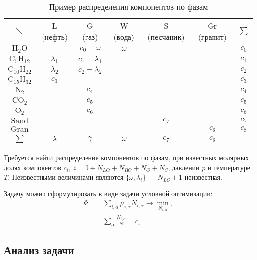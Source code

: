 \documentclass[12pt]{article}
\let\dividesymbol\div
\renewcommand{\div}{\operatorname{div}}
\begin{document}
\begin{table}[ht!]
\centering
\begin{tabular}{c|c|c|c|c|c|c}
\multicolumn{1}{c}{$\diagdown$}&
\multicolumn{1}{c}{L (нефть)}&
\multicolumn{1}{c}{G (газ)}&
\multicolumn{1}{c}{W (вода)}&
\multicolumn{1}{c}{S (песчаник)}&
Gr (гранит)&
$\sum$\\
\cline{2-6}
$\mathrm{H_2O}$& & $c_0 - \omega$ & $\omega$ & & & $c_0$\\
\cline{1-6}
$\mathrm{C_5H_{12}}$& $\lambda_1$ & $c_1 - \lambda_1$ & & & & $c_1$\\
\cline{2-6}
$\mathrm{C_{10}H_{22}}$& $\lambda_2$ & $c_2 - \lambda_2$ & & & & $c_2$\\
\cline{1-6}
$\mathrm{C_{15}H_{32}}$& $c_3$ & & & & & $c_3$\\
\cline{1-6}
$\mathrm{N_2}$& & $c_4$ & & & & $c_4$\\
\cline{2-6}
$\mathrm{CO_2}$& & $c_5$ & & & & $c_5$\\
\cline{2-6}
$\mathrm{O_2}$& & $c_6$ & & & & $c_6$\\
\cline{1-6}
$\mathrm{Sand}$& & & & $c_7$ & & $c_7$\\
\cline{2-6}
$\mathrm{Gran}$& & & & & $c_8$ & $c_8$\\
\cline{1-6}
\multicolumn{1}{c}{$\sum$}&
\multicolumn{1}{c}{$\lambda$}&
\multicolumn{1}{c}{$\gamma$}&
\multicolumn{1}{c}{$\omega$}&
\multicolumn{1}{c}{$c_7$}&
\multicolumn{1}{c}{$c_8$}\\
\end{tabular}
\caption{Пример распределения компонентов по фазам}
\label{t:compphases}
\end{table}

Требуется найти распределение компонентов по фазам, при известных молярных долях компонентов $c_i, \; i = 0 \dividesymbol N_{LO} + N_{HO} + N_{G} + N_{S}$, давлении $p$ и температуре $T$. Неизвестными величинами являются $\{\omega, \lambda_i\}$ --- $N_{LO} + 1$ неизвестная.

Задачу можно сформулировать в виде задачи условной оптимизации:
\begin{equation}
\begin{aligned}
\Phi = &\sum_{i, \alpha} \mu_{i, \alpha} N_{i, \alpha} \rightarrow \min_{N_{i, \alpha}},\\
&\sum_\alpha \frac{N_{i, \alpha}}{N} = c_i
\end{aligned}
\label{eq:problem}
\end{equation}

\subsection{Анализ задачи}
\end{document}
